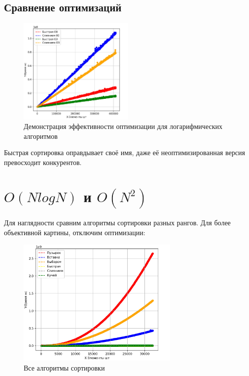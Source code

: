\documentclass[a4paper,12pt]{article} %
\begin{document}
\subsection{Сравнение оптимизаций}
\begin{figure}[!h]
    \centering
    \includegraphics[width=0.5\textwidth]{img/first/qwoptim.jpg}
    \caption{Демонстрация эффективности оптимизации для логарифмических алгоритмов}
\end{figure} 
Быстрая сортировка оправдывает своё имя, даже её неоптимизированная версия превосходит конкурентов.

\section{$O(NlogN)$ и $O(N^2)$}
Для наглядности сравним алгоритмы сортировки разных рангов. Для более объективной картины, отключим оптимизации:
\begin{figure}[H]
    \centering
    \includegraphics[width=0.7\textwidth]{img/first/all.jpg}
    \caption{Все алгоритмы сортировки}
\end{figure} 
\end{document}
